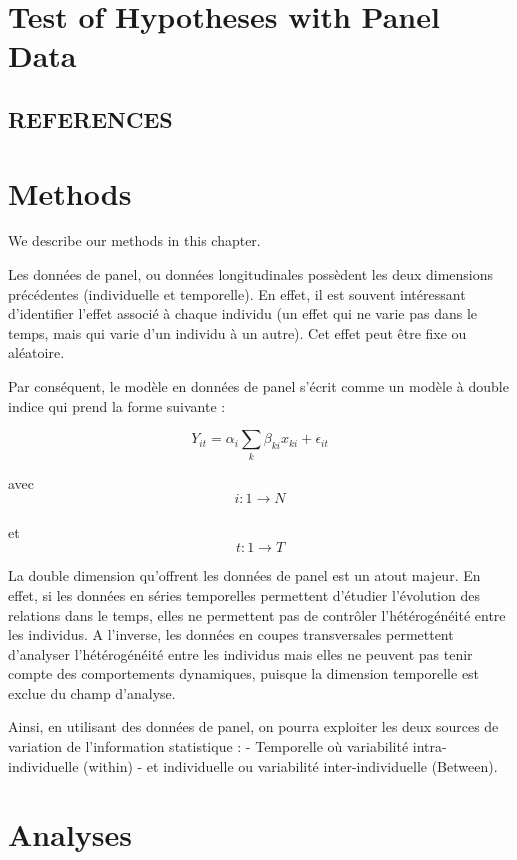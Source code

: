 \documentclass[
]{book}
\begin{document}
\hypertarget{test-of-hypotheses-with-panel-data}{%
\chapter{Test of Hypotheses with Panel Data}\label{test-of-hypotheses-with-panel-data}}

\hypertarget{references}{%
\section{REFERENCES}\label{references}}

\hypertarget{methods}{%
\chapter{Methods}\label{methods}}

We describe our methods in this chapter.

Les données de panel, ou données longitudinales possèdent les deux dimensions précédentes (individuelle et temporelle). En effet, il est souvent intéressant d'identifier l'effet associé à chaque individu (un effet qui ne varie pas dans le temps, mais qui varie d'un individu à un autre). Cet effet peut être fixe ou aléatoire.

Par conséquent, le modèle en données de panel s'écrit comme un modèle à double indice qui prend la forme suivante :

\[ Y_{it}= \alpha_i\sum_{k}\beta_{ki}x_{ki}+ \epsilon_{it} \]

avec
\[ i:1 \rightarrow N \]\\
et
\[ t:1 \rightarrow T \]

La double dimension qu'offrent les données de panel est un atout majeur. En effet, si les données en séries temporelles permettent d'étudier l'évolution des relations dans le temps, elles ne permettent pas de contrôler l'hétérogénéité entre les individus. A l'inverse, les données en coupes transversales permettent d'analyser l'hétérogénéité entre les individus mais elles ne peuvent pas tenir compte des comportements dynamiques, puisque la dimension temporelle est exclue du champ d'analyse.

Ainsi, en utilisant des données de panel, on pourra exploiter les deux sources de variation de l'information statistique :
- Temporelle où variabilité intra-individuelle (within)
- et individuelle ou variabilité inter-individuelle (Between).

\hypertarget{analyses}{%
\chapter{Analyses}\label{analyses}}
\end{document}
